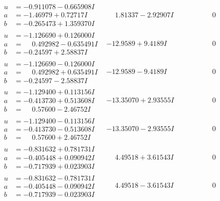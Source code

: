 \documentclass[1p]{elsarticle_modified}
\theoremstyle{definition}
\begin{document}
$$\begin{array}{c|c|c}
\begin{aligned}
u &= -0.911078 - 0.665908 I \\
a &= -1.46979 + 0.72717 I \\
b &= -0.265473 + 1.359370 I\end{aligned}
 & \phantom{-}1.81337 - 2.92907 I & \phantom{-0.000000 } 0 \\ \hline\begin{aligned}
u &= -1.126690 + 0.126000 I \\
a &= \phantom{-}0.492982 - 0.635491 I \\
b &= -0.24597 + 2.58837 I\end{aligned}
 & -12.9589 + 9.4189 I & \phantom{-0.000000 } 0 \\ \hline\begin{aligned}
u &= -1.126690 - 0.126000 I \\
a &= \phantom{-}0.492982 + 0.635491 I \\
b &= -0.24597 - 2.58837 I\end{aligned}
 & -12.9589 - 9.4189 I & \phantom{-0.000000 } 0 \\ \hline\begin{aligned}
u &= -1.129400 + 0.113156 I \\
a &= -0.413730 + 0.513608 I \\
b &= \phantom{-}0.57600 - 2.46752 I\end{aligned}
 & -13.35070 + 2.93555 I & \phantom{-0.000000 } 0 \\ \hline\begin{aligned}
u &= -1.129400 - 0.113156 I \\
a &= -0.413730 - 0.513608 I \\
b &= \phantom{-}0.57600 + 2.46752 I\end{aligned}
 & -13.35070 - 2.93555 I & \phantom{-0.000000 } 0 \\ \hline\begin{aligned}
u &= -0.831632 + 0.781731 I \\
a &= -0.405448 + 0.090942 I \\
b &= -0.717939 + 0.023903 I\end{aligned}
 & \phantom{-}4.49518 + 3.61543 I & \phantom{-0.000000 } 0 \\ \hline\begin{aligned}
u &= -0.831632 - 0.781731 I \\
a &= -0.405448 - 0.090942 I \\
b &= -0.717939 - 0.023903 I\end{aligned}
 & \phantom{-}4.49518 - 3.61543 I & \phantom{-0.000000 } 0 \\ \hline\begin{aligned}

\end{aligned}
\end{array}$$
\end{document}

